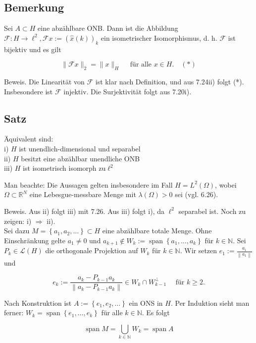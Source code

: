 \documentclass[10pt, letterpaper]{article}
\begin{document}
\subsection*{Bemerkung}
Sei $A \subset H$ eine abzählbare ONB. Dann ist die Abbildung $\mathcal{F}: H \rightarrow \ell^{2}, \mathcal{F} x:=(\hat{x}(k))_{k}$ ein isometrischer Isomorphismus, d. h. $\mathcal{F}$ ist bijektiv und es gilt

$$
\|\mathcal{F} x\|_{2}=\|x\|_{H} \quad \text { für alle } x \in H . \quad(*)
$$

Beweis. Die Linearität von $\mathcal{F}$ ist klar nach Definition, und aus 7.24ii) folgt (*). Insbesondere ist $\mathcal{F}$ injektiv. Die Surjektivität folgt aus 7.20i).

\subsection*{Satz}
Äquivalent sind:\\
i) $H$ ist unendlich-dimensional und separabel\\
ii) $H$ besitzt eine abzählbar unendliche ONB\\
iii) $H$ ist isometrisch isomorph $\mathrm{zu} \ell^{2}$

Man beachte: Die Aussagen gelten insbesondere im Fall $H=L^{2}(\Omega)$, wobei $\Omega \subset \mathbb{R}^{N}$ eine Lebesgue-messbare Menge mit $\lambda(\Omega)>0$ sei (vgl. 6.26).

Beweis. Aus ii) folgt iii) mit 7.26. Aus iii) folgt i), da $\ell^{2}$ separabel ist. Noch zu zeigen: i) $\Longrightarrow$ ii).\\
Sei dazu $M=\left\{a_{1}, a_{2}, \ldots\right\} \subset H$ eine abzählbare totale Menge. Ohne Einschränkung gelte $a_{1} \neq 0$ und $a_{k+1} \notin W_{k}:=\operatorname{span}\left\{a_{1}, \ldots, a_{k}\right\}$ für $k \in \mathbb{N}$. Sei $P_{k} \in \mathcal{L}(H)$ die orthogonale Projektion auf $W_{k}$ für $k \in \mathbb{N}$. Wir setzen $e_{1}:=\frac{a_{1}}{\left\|a_{1}\right\|}$ und

$$
e_{k}:=\frac{a_{k}-P_{k-1} a_{k}}{\left\|a_{k}-P_{k-1} a_{k}\right\|} \in W_{k} \cap W_{k-1}^{\perp} \quad \text { für } k \geq 2 .
$$

Nach Konstruktion ist $A:=\left\{e_{1}, e_{2}, \ldots\right\}$ ein ONS in $H$. Per Induktion sieht man ferner: $W_{k}=\operatorname{span}\left\{e_{1}, \ldots, e_{k}\right\}$ für alle $k \in \mathbb{N}$. Es folgt

$$
\operatorname{span} M=\bigcup_{k \in \mathbb{N}} W_{k}=\operatorname{span} A
$$
\end{document}
